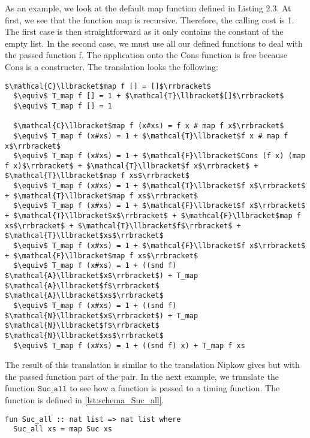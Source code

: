 As an example, we look at the default map function defined in Listing 2.3. At first, we see that the function map is recursive.
Therefore, the calling cost is 1.
The first case is then straightforward as it only contains the constant of the empty list.
In the second case, we must use all our defined functions to deal with the passed function f.
The application onto the Cons function is free because Cons is a constructer.
The translation looks the following:
\begin{lstlisting}[mathescape=true,language=translation]
  $\mathcal{C}\llbracket$map f [] = []$\rrbracket$
  $\equiv$ T_map f [] = 1 + $\mathcal{T}\llbracket$[]$\rrbracket$
  $\equiv$ T_map f [] = 1

  $\mathcal{C}\llbracket$map f (x#xs) = f x # map f x$\rrbracket$
  $\equiv$ T_map f (x#xs) = 1 + $\mathcal{T}\llbracket$f x # map f x$\rrbracket$
  $\equiv$ T_map f (x#xs) = 1 + $\mathcal{F}\llbracket$Cons (f x) (map f x)$\rrbracket$ + $\mathcal{T}\llbracket$f x$\rrbracket$ + $\mathcal{T}\llbracket$map f xs$\rrbracket$
  $\equiv$ T_map f (x#xs) = 1 + $\mathcal{T}\llbracket$f x$\rrbracket$ + $\mathcal{T}\llbracket$map f xs$\rrbracket$
  $\equiv$ T_map f (x#xs) = 1 + $\mathcal{F}\llbracket$f x$\rrbracket$ + $\mathcal{T}\llbracket$x$\rrbracket$ + $\mathcal{F}\llbracket$map f xs$\rrbracket$ + $\mathcal{T}\llbracket$f$\rrbracket$ + $\mathcal{T}\llbracket$xs$\rrbracket$
  $\equiv$ T_map f (x#xs) = 1 + $\mathcal{F}\llbracket$f x$\rrbracket$ + $\mathcal{F}\llbracket$map f xs$\rrbracket$
  $\equiv$ T_map f (x#xs) = 1 + ((snd f) $\mathcal{A}\llbracket$x$\rrbracket$) + T_map $\mathcal{A}\llbracket$f$\rrbracket$ $\mathcal{A}\llbracket$xs$\rrbracket$
  $\equiv$ T_map f (x#xs) = 1 + ((snd f) $\mathcal{N}\llbracket$x$\rrbracket$) + T_map $\mathcal{N}\llbracket$f$\rrbracket$ $\mathcal{N}\llbracket$xs$\rrbracket$
  $\equiv$ T_map f (x#xs) = 1 + ((snd f) x) + T_map f xs
\end{lstlisting}

The result of this translation is similar to the translation Nipkow gives but with the passed function part of the pair.
In the next example, we translate the function $\texttt{Suc\_all}$ to see how a function is passed to a timing function.
The function is defined in \autoref{lst:schema_Suc_all}.

\begin{lstlisting}[language=isabelle,caption=Example function increasing every element in list of natural numbers,label=lst:schema_Suc_all]
fun Suc_all :: nat list => nat list where
  Suc_all xs = map Suc xs
\end{lstlisting}


